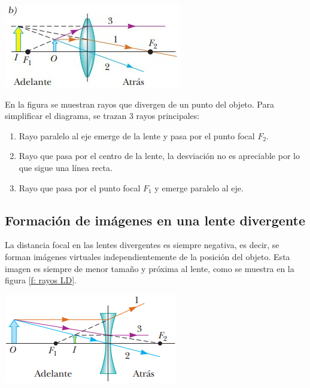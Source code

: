 \documentclass[a4paper,12pt]{article}
\newenvironment{Figure}
  {\par\medskip\noindent\minipage{\linewidth}}
  {\endminipage\par\medskip}
\begin{document}
\begin{multicols*}{2}
        \begin{Figure}
            \centering
            \includegraphics[width=0.7\linewidth]{Diagrama de rayos LC 2.jpg}
            \label{Diag rayos LC}
        \end{Figure}

       En la figura se muestran rayos que divergen de un punto del objeto. Para simplificar el diagrama, se trazan 3 rayos principales:

        \begin{enumerate}
            \item Rayo paralelo al eje emerge de la lente y pasa por el punto focal $F_{2}$.
            \item Rayo que pasa por el centro de la lente, la desviación no es apreciable por lo que sigue una línea recta.
            \item Rayo que pasa por el punto focal $F_{1}$ y emerge paralelo al eje.
        \end{enumerate}

    \subsection*{Formación de imágenes en una lente divergente}

        La distancia focal en las lentes divergentes es siempre negativa, es decir, se forman imágenes virtuales independientemente de la posición del objeto. Esta imagen es siempre de menor tamaño y próxima al lente, como se muestra en la figura \ref{f: rayos LD}.

        \begin{Figure}
            \centering
            \includegraphics[width=0.9\linewidth]{Diag de rayos LD.png}
            \label{f: rayos LD}
        \end{Figure}


\end{multicols*}
\end{document}
